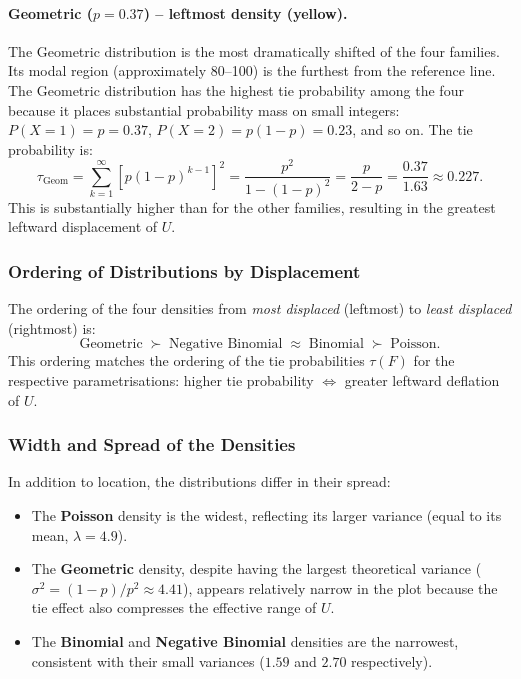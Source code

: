 \documentclass[10pt]{article}
\begin{document}
\paragraph{Geometric ($p = 0.37$) -- leftmost density (yellow).}
The Geometric distribution is the most dramatically shifted of the
four families. Its modal region (approximately 80--100) is the
furthest from the reference line. The Geometric distribution has
the highest tie probability among the four because it places
substantial probability mass on small integers: $P(X = 1) = p =
0.37$, $P(X = 2) = p(1-p) = 0.23$, and so on.
The tie probability is:
\[
  \tau_{\text{Geom}}
  = \sum_{k=1}^{\infty} [p(1-p)^{k-1}]^2
  = \frac{p^2}{1-(1-p)^2}
  = \frac{p}{2 - p}
  = \frac{0.37}{1.63}
  \approx 0.227.
\]
This is substantially higher than for the other families, resulting
in the greatest leftward displacement of $U$.

\subsubsection{Ordering of Distributions by Displacement}

The ordering of the four densities from \emph{most displaced} (leftmost)
to \emph{least displaced} (rightmost) is:
\[
  \text{Geometric}
  \;\succ\; \text{Negative Binomial}
  \;\approx\; \text{Binomial}
  \;\succ\; \text{Poisson}.
\]
This ordering matches the ordering of the tie probabilities
$\tau(F)$ for the respective parametrisations: higher tie probability
$\Leftrightarrow$ greater leftward deflation of $U$.

\subsubsection{Width and Spread of the Densities}

In addition to location, the distributions differ in their spread:
\begin{itemize}[noitemsep]
  \item The \textbf{Poisson} density is the widest, reflecting its
        larger variance (equal to its mean, $\lambda = 4.9$).
  \item The \textbf{Geometric} density, despite having the largest
        theoretical variance ($\sigma^2 = (1-p)/p^2 \approx 4.41$),
        appears relatively narrow in the plot because the tie effect
        also compresses the effective range of $U$.
  \item The \textbf{Binomial} and \textbf{Negative Binomial}
        densities are the narrowest, consistent with their small
        variances ($1.59$ and $2.70$ respectively).
\end{itemize}
\end{document}
